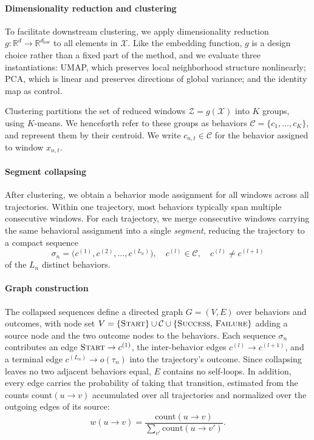 \documentclass[letterpaper, 10 pt, conference]{ieeeconf}
\newcommand{\successnode}{\textsc{Success}}
\newcommand{\failnode}{\textsc{Failure}}
\newcommand{\rollout}{\tau}
\begin{document}
\paragraph{Dimensionality reduction and clustering}

To facilitate downstream clustering, we apply dimensionality reduction \(g: \mathbb{R}^d \to \mathbb{R}^{d_\text{low}} \) to all elements in \(\mathcal{X}\). Like the embedding function, \(g\) is a design choice rather than a fixed part of the method, and we evaluate three instantiations: UMAP, which preserves local neighborhood structure nonlinearly; PCA, which is linear and preserves directions of global variance; and the identity map as control.

Clustering partitions the set of reduced windows \(\mathcal{Z} = g(\mathcal{X})\) into \(K\) groups, using \(K\)-means. We henceforth refer to these groups as behaviors \(\mathcal{C} = \{c_1, \ldots, c_K\}\), and represent them by their centroid. We write \(c_{n,t} \in \mathcal{C}\) for the behavior assigned to window \(x_{n,t}\).

\paragraph{Segment collapsing}
After clustering, we obtain a behavior mode assignment for all windows across all trajectories. Within one trajectory, most behaviors typically span multiple consecutive windows. For each trajectory, we merge consecutive windows carrying the same behavioral assignment into a single \emph{segment}, reducing the trajectory to a compact sequence
\begin{equation}
  \sigma_n = \bigl(c^{(1)}, c^{(2)}, \ldots, c^{(L_n)}\bigr), \quad c^{(l)} \in \mathcal{C}, \quad c^{(l)} \neq c^{(l+1)}
  \label{eq:collapsed}
\end{equation}
of the \(L_n\) distinct behaviors.

\paragraph{Graph construction}
The collapsed sequences define a directed graph \(G = (V, E)\) over behaviors and outcomes, with node set $V = \{\textsc{Start}\} \cup \mathcal{C} \cup \{\successnode,\, \failnode\}$ adding a source node and the two outcome nodes to the behaviors. Each sequence \(\sigma_n\) contributes an edge \(\textsc{Start} \to c^{(1)}\), the inter-behavior edges \(c^{(l)} \to c^{(l+1)}\), and a terminal edge \(c^{(L_n)} \to o(\rollout_n)\) into the trajectory's outcome. Since collapsing leaves no two adjacent behaviors equal, \(E\) contains no self-loops. In addition, every edge carries the probability of taking that transition, estimated from the counts \(\mathrm{count}(u \to v)\) accumulated over all trajectories and normalized over the outgoing edges of its source:
\begin{equation}
  w(u \to v) = \frac{\mathrm{count}(u \to v)}{\sum_{v'} \mathrm{count}(u \to v')}.
  \label{eq:edge_weights}
\end{equation}
\end{document}
